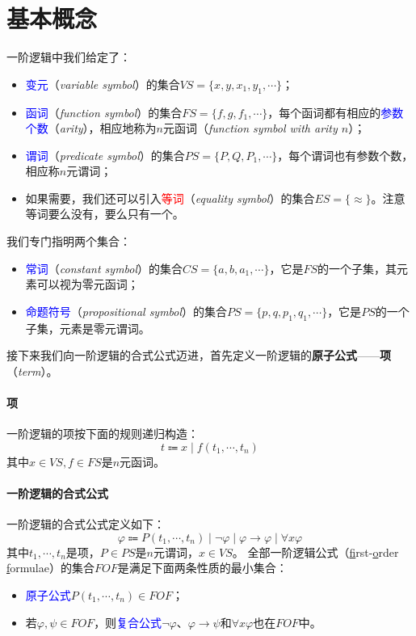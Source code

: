 \documentclass[b5paper,oneside]{ctexbook}
\newcommand{\Blue}[1]{\textcolor[named]{blue}{#1}}
\newcommand{\Red}[1]{\textcolor[named]{red}{#1}}
\begin{document}
\section{基本概念}
一阶逻辑中我们给定了：\label{folsets}
\begin{itemize}
\item \Blue{变元}（\textit{variable symbol}）的集合$VS=\{x,y,x_1,y_1,\cdots\}$；
\item \Blue{函词}（\textit{function symbol}）的集合$FS=\{f,g,f_1,\cdots\}$，每个函词都有相应的\Blue{参数个数}（\textit{arity}），相应地称为$n$元函词（\textit{function symbol with arity $n$}）；
\item \Blue{谓词}（\textit{predicate symbol}）的集合$PS=\{P,Q,P_1,\cdots\}$，每个谓词也有参数个数，相应称$n$元谓词；
\item 如果需要，我们还可以引入\Red{等词}（\textit{equality symbol}）的集合$ES=\{\approx\}$。注意等词要么没有，要么只有一个。
\end{itemize}
我们专门指明两个集合：
\begin{itemize}
\item \Blue{常词}（\textit{constant symbol}）的集合$CS=\{a,b,a_1,\cdots\}$，它是$FS$的一个子集，其元素可以视为零元函词；
\item \Blue{命题符号}（\textit{propositional symbol}）的集合$PS=\{p,q,p_1,q_1,\cdots\}$，它是$PS$的一个子集，元素是零元谓词。
\end{itemize}

接下来我们向一阶逻辑的合式公式迈进，首先定义一阶逻辑的\textbf{原子公式}——\textbf{项}（\textit{term}）。
\paragraph{项}一阶逻辑的项按下面的规则递归构造：
\[t\Coloneqq x\mid f(t_1,\cdots ,t_n)\]
其中$x\in VS,f\in FS$是$n$元函词。\label{terms}
\paragraph{一阶逻辑的合式公式}一阶逻辑的合式公式定义如下：\label{folwff}
\[\varphi\Coloneqq P(t_1,\cdots ,t_n)\mid\neg\varphi\mid\varphi\to\varphi\mid\forall x\varphi\]
其中$t_1,\cdots ,t_n$是项，$P\in PS$是$n$元谓词，$x\in VS$。
全部一阶逻辑公式（\underline{f}irst-\underline{o}rder \underline{f}ormulae）的集合$FOF$是满足下面两条性质的最小集合：
\begin{itemize}
\item \Blue{原子公式}$P(t_1,\cdots ,t_n)\in FOF$；
\item 若$\varphi,\psi\in FOF$，则\Blue{复合公式}$\neg\varphi$、$\varphi\to\psi$和$\forall x\varphi$也在$FOF$中。
\end{itemize}
\end{document}
